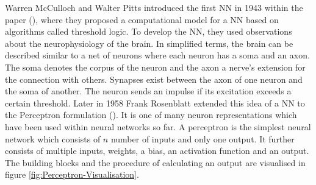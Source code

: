 \noindent
Warren McCulloch and Walter Pitts introduced the first \gls{NN} in 1943 within the paper (\cite{mcculloch_logical_1943}), where they proposed a computational model for a \gls{NN} based on algorithms called threshold logic. To develop the \gls{NN}, they used observations about the neurophysiology of the brain. In simplified terms, the brain can be described similar to a net of neurons where each neuron has a soma and an axon. The soma denotes the corpus of the neuron and the axon a nerve’s extension for the connection with others. Synapses exist between the axon of one neuron and the soma of another. The neuron sends an impulse if its excitation exceeds a certain threshold. Later in 1958 Frank Rosenblatt extended this idea of a \gls{NN} to the Perceptron formulation (\cite{rosenblatt_perceptron_1958}). It is one of many neuron representations which have been used within neural networks so far.
\newline
\newline
A perceptron is the simplest neural network which consists of $n$ number of inputs and only one output. It further consists of multiple inputs, weights, a bias, an activation function and an output. The building blocks and the procedure of calculating an output are visualised in figure \ref{fig:Perceptron-Visualisation}.

